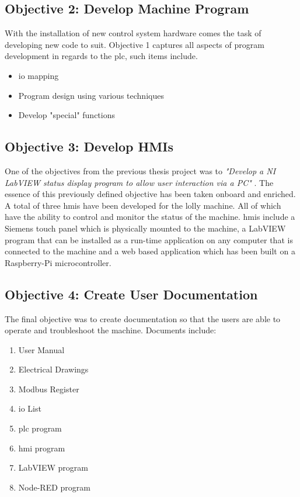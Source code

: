     \subsection{Objective 2: Develop Machine Program}
        With the installation of new control system hardware comes the task of developing new code to suit.
        Objective 1 captures all aspects of program development in regards to the \acrshort{plc}, such items include.
        \begin{itemize}
            \item \acrshort{io} mapping
            \item Program design using various techniques
            \item Develop "special" functions
        \end{itemize}

        
        
    \subsection{Objective 3: Develop HMIs}
        
        One of the objectives from the previous thesis project was to \textit{"Develop a NI LabVIEW status display program to allow user interaction via a PC"} \cite{thesisJodie}. The essence of this previously defined objective has been taken onboard and enriched. A total of three \acrshort{hmi}s have been developed for the lolly machine. All of which have the ability to control and monitor the status of the machine. \acrshort{hmi}s include a Siemens touch panel which is physically mounted to the machine, a LabVIEW program that can be installed as a run-time application on any computer that is connected to the machine and a web based application which has been built on a Raspberry-Pi microcontroller.
        
    \subsection{Objective 4: Create User Documentation}
        The final objective was to create documentation so that the users are able to operate and troubleshoot the machine. Documents include:

        \begin{enumerate}
            \item   User Manual
            \item   Electrical Drawings
            \item   Modbus Register
            \item   \acrshort{io} List
            \item   \acrshort{plc} program
            \item   \acrshort{hmi} program
            \item   LabVIEW program
            \item   Node-RED program
        \end{enumerate}
        

